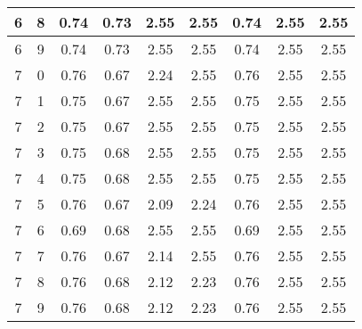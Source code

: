 \begin{longtable}{|c|c||c||c|c|c||c|c|c|}
	6 & 8 & 0.74 & 0.73 & 2.55 & 2.55 & 0.74 & 2.55 & 2.55 \\ \hline
	6 & 9 & 0.74 & 0.73 & 2.55 & 2.55 & 0.74 & 2.55 & 2.55 \\ \hline
	7 & 0 & 0.76 & 0.67 & 2.24 & 2.55 & 0.76 & 2.55 & 2.55 \\ \hline
	7 & 1 & 0.75 & 0.67 & 2.55 & 2.55 & 0.75 & 2.55 & 2.55 \\ \hline
	7 & 2 & 0.75 & 0.67 & 2.55 & 2.55 & 0.75 & 2.55 & 2.55 \\ \hline
	7 & 3 & 0.75 & 0.68 & 2.55 & 2.55 & 0.75 & 2.55 & 2.55 \\ \hline
	7 & 4 & 0.75 & 0.68 & 2.55 & 2.55 & 0.75 & 2.55 & 2.55 \\ \hline
	7 & 5 & 0.76 & 0.67 & 2.09 & 2.24 & 0.76 & 2.55 & 2.55 \\ \hline
	7 & 6 & 0.69 & 0.68 & 2.55 & 2.55 & 0.69 & 2.55 & 2.55 \\ \hline
	7 & 7 & 0.76 & 0.67 & 2.14 & 2.55 & 0.76 & 2.55 & 2.55 \\ \hline
	7 & 8 & 0.76 & 0.68 & 2.12 & 2.23 & 0.76 & 2.55 & 2.55 \\ \hline
	7 & 9 & 0.76 & 0.68 & 2.12 & 2.23 & 0.76 & 2.55 & 2.55 \\ \hline
\end{longtable}
\clearpage{}
